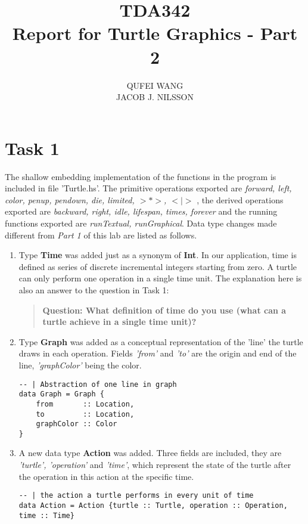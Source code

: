 \documentclass[10pt]{article}
\title{TDA342\\ Report for Turtle Graphics - Part 2}
\author{QUFEI WANG \\ JACOB J. NILSSON}
\begin{document}
\maketitle
\section*{Task 1}
The shallow embedding implementation of the functions in the program is included in file 'Turtle.hs'. The primitive operations exported are \emph{forward, left, color, penup, pendown, die, limited, $>*>$, $<|>$ }, the derived operations exported are \emph{backward, right, idle, lifespan, times, forever} and the running functions exported are \emph{runTextual, runGraphical}. Data type changes made different from \textit{Part 1} of this lab are listed as follows.
\begin{enumerate}
\item Type \textbf{Time} was added just as a synonym of \textbf{Int}. In our application, time is defined as series of discrete incremental integers starting from zero. A turtle can only perform one operation in a single time unit. The explanation here is also an answer to the question in Task 1:
\begin{quote}
\textbf{Question: What definition of time do you use (what can a turtle achieve in a single time unit)?}
\end{quote}

\item Type \textbf{Graph} was added as a conceptual representation of the 'line' the turtle draws in each operation. Fields \textit{'from'} and \textit{'to'} are the origin and end of the line, \textit{'graphColor'} being the color.
\begin{lstlisting}
-- | Abstraction of one line in graph
data Graph = Graph {
    from       :: Location,
    to         :: Location,
    graphColor :: Color
}
\end{lstlisting}

\item A new data type \textbf{Action} was added. Three fields are included, they are \textit{'turtle', 'operation'} and \textit{'time'}, which represent the state of the turtle after the operation in this action at the specific time.
\begin{lstlisting}
-- | the action a turtle performs in every unit of time
data Action = Action {turtle :: Turtle, operation :: Operation, time :: Time}
\end{lstlisting}


\end{enumerate}
\end{document}

